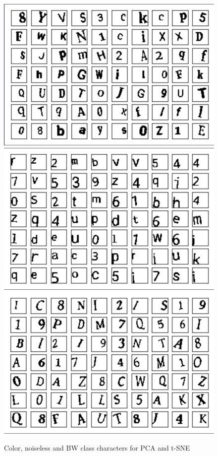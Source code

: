 \documentclass[twocolumn,10pt]{article}
\begin{document}
\begin{center}
\begin{figure}
  \includegraphics[width=\linewidth]{color_chars.png}
  \includegraphics[width=\linewidth]{sutd_chars.png}
  \includegraphics[width=\linewidth]{bw_chars.png}
  \caption{Color, noiseless and BW class characters for PCA and t-SNE}
  \label{fig:pcachars}
\end{figure}


\end{center}
\end{document}
